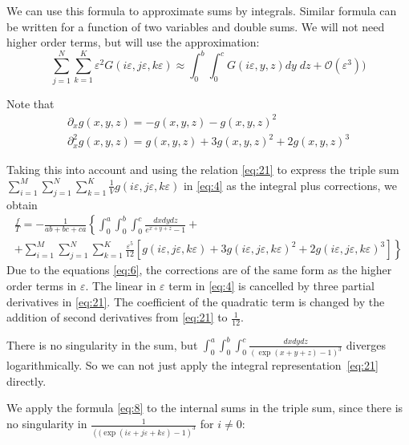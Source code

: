 \documentclass{article}
\begin{document}
We can use this formula to approximate sums by integrals. Similar formula can be written for a
function of two variables and double sums. We will not need higher order terms, but will use the
approximation:
\begin{equation}
\label{eq:8}
  \sum_{j=1}^{N}\sum_{k=1}^{K}\varepsilon^{2}G\left(i\varepsilon,j\varepsilon,k\varepsilon\right)\approx \int_{0}^{b}\int_{0}^{c}G(i\varepsilon,y,z) dy\; dz+\mathcal{O}(\varepsilon^{3}))
\end{equation}


Note that
\begin{equation}
  \label{eq:6}
  \begin{array}{c}
    \partial_{x}g(x,y,z)=-g(x,y,z)-g(x,y,z)^{2}\\
    \partial_{x}^{2}g(x,y,z)=g(x,y,z)+3g(x,y,z)^{2}+2g(x,y,z)^{3}
  \end{array}
\end{equation}

Taking this into account and using the relation \eqref{eq:21} to express the triple sum
$ \sum_{i=1}^{M} \sum_{j=1}^{N} \sum_{k=1}^{K} \frac{1}{V}    g(i\varepsilon,j\varepsilon,k\varepsilon)$
in \eqref{eq:4} as the integral plus corrections, we obtain
\begin{multline}
\label{eq:23}
  \frac{f}{T}=-\frac{1}{ab+bc+ca}\left\{\int_{0}^{a} \int_{0}^{b}\int_{0}^{c}\frac{dx dy dz}{e^{x+y+z}-1}+\right.\\
  \left.+\sum_{i=1}^{M}\sum_{j=1}^{N}\sum_{k=1}^{K}\frac{\varepsilon^{5}}{12}\left[g(i\varepsilon,j\varepsilon,k\varepsilon)+3
      g(i\varepsilon,j\varepsilon,k\varepsilon)^{2}+2
      g(i\varepsilon,j\varepsilon,k\varepsilon)^{3}\right]\right\}
\end{multline}
Due to the equations \eqref{eq:6}, the corrections are of the same form as the higher order terms in
$\varepsilon$. The linear in $\varepsilon$ term in \eqref{eq:4} is cancelled by three partial
derivatives in \eqref{eq:21}. The coefficient of the quadratic term is changed by the addition of
second derivatives from \eqref{eq:21} to $\frac{1}{12}$.


There is no singularity in the sum, but
$\int_{0}^{a} \int_{0}^{b}\int_{0}^{c}\frac{dx dy dz}{(\exp(x+y+z)-1)^{3}}$ diverges
logarithmically. So we can not just apply the integral representation~\eqref{eq:21} directly.

We apply the formula \eqref{eq:8} to the internal sums in the triple sum, since there is no
singularity in $\frac{1}{\left((\exp(i\varepsilon+j\varepsilon+k\varepsilon)-1\right)^{3}}$ for
$i\neq 0$:
\end{document}
